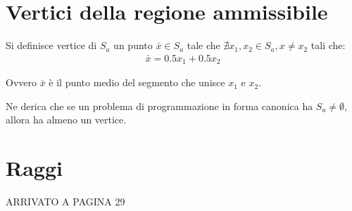 \section{Vertici della regione ammissibile}

Si definisce vertice di $S_a$ un punto $\bar{x} \in S_a$ tale che $\nexists x_1, x_2 \in S_a, x \neq x_2$ tali che:
\begin{align}
  \bar{x} = 0.5 x_1 + 0.5 x_2
\end{align}

Ovvero $\bar{x}$ è il punto medio del segmento che unisce $x_1$ e $x_2$.



Ne derica che se un problema di programmazione in forma canonica ha $S_a\neq \emptyset$, allora ha almeno un vertice.


\section{Raggi}

ARRIVATO A PAGINA 29
